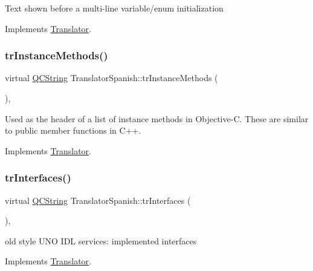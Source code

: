 Text shown before a multi-\/line variable/enum initialization 

Implements \mbox{\hyperlink{class_translator}{Translator}}.

\mbox{\label{class_translator_spanish_a4f089c4b134c4ad0547e8ae9ff720d63}} 
\subsubsection{\texorpdfstring{trInstanceMethods()}{trInstanceMethods()}}
{\footnotesize\ttfamily virtual \mbox{\hyperlink{class_q_c_string}{Q\+C\+String}} Translator\+Spanish\+::tr\+Instance\+Methods (\begin{DoxyParamCaption}{ }\end{DoxyParamCaption})\hspace{0.3cm}{\ttfamily [inline]}, {\ttfamily [virtual]}}

Used as the header of a list of instance methods in Objective-\/C. These are similar to public member functions in C++. 

Implements \mbox{\hyperlink{class_translator}{Translator}}.

\mbox{\label{class_translator_spanish_a3dd8adbe531c4f498eec4a249506fdb7}} 
\subsubsection{\texorpdfstring{trInterfaces()}{trInterfaces()}}
{\footnotesize\ttfamily virtual \mbox{\hyperlink{class_q_c_string}{Q\+C\+String}} Translator\+Spanish\+::tr\+Interfaces (\begin{DoxyParamCaption}{ }\end{DoxyParamCaption})\hspace{0.3cm}{\ttfamily [inline]}, {\ttfamily [virtual]}}

old style U\+NO I\+DL services\+: implemented interfaces 

Implements \mbox{\hyperlink{class_translator}{Translator}}.

\mbox{\label{class_translator_spanish_aa52087053a191ee4614664d840168f91}} 
